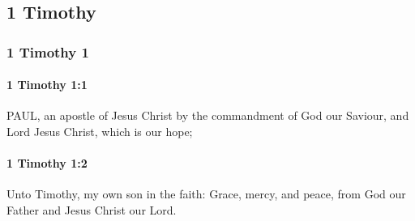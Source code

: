 \subsection{1 Timothy}
	\label{1TIMOTHY}
	
	\subsubsection{1 Timothy 1} %
		\label{1TIMOTHY-1}
		
		\paragraph{1 Timothy 1:1} %
			\label{1TIMOTHY-1-1}

			PAUL, an apostle of Jesus Christ by the commandment of God our Saviour, and Lord Jesus Christ, which is our hope;

			\begin{framed}
			\scriptsize
				\begin{compactdesc}
					\item[SBLG] 
				\end{compactdesc}
			\end{framed}

		\paragraph{1 Timothy 1:2} %
			\label{1TIMOTHY-1-2}

			Unto Timothy, my own son in the faith: Grace, mercy, and peace, from God our Father and Jesus Christ our Lord.


